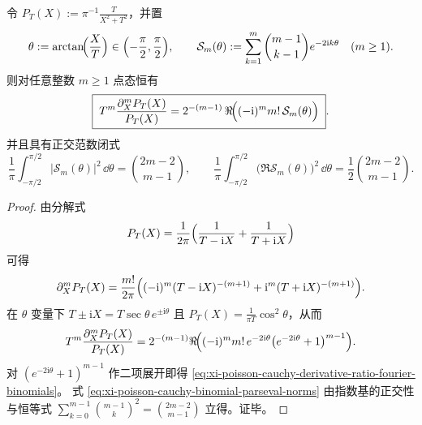 \begin{proposition}\label{prop:xi-poisson-cauchy-derivative-ratio-fourier-binomials}
令 \(P_T(X):=\pi^{-1}\frac{T}{X^2+T^2}\)，并置
\[
\theta:=\arctan\!\Bigl(\frac{X}{T}\Bigr)\in\Bigl(-\frac{\pi}{2},\frac{\pi}{2}\Bigr),
\qquad
\mathcal S_m(\theta):=\sum_{k=1}^{m}\binom{m-1}{k-1}e^{-2\mathrm{i}k\theta}\quad(m\ge 1).
\]
则对任意整数 \(m\ge 1\) 点态恒有
\begin{equation}\label{eq:xi-poisson-cauchy-derivative-ratio-fourier-binomials}
\boxed{\;
T^{m}\frac{\partial_X^{m}P_T(X)}{P_T(X)}
=2^{-(m-1)}\,\Re\!\Bigl((-\mathrm{i})^{m}m!\,\mathcal S_m(\theta)\Bigr)\; }.
\end{equation}
并且具有正交范数闭式
\begin{equation}\label{eq:xi-poisson-cauchy-binomial-parseval-norms}
\frac{1}{\pi}\int_{-\pi/2}^{\pi/2}\bigl|\mathcal S_m(\theta)\bigr|^2\,\dd\theta=\binom{2m-2}{m-1},
\qquad
\frac{1}{\pi}\int_{-\pi/2}^{\pi/2}\bigl(\Re\mathcal S_m(\theta)\bigr)^2\,\dd\theta=\frac12\binom{2m-2}{m-1}.
\end{equation}
\end{proposition}
\begin{proof}
由分解式
\[
P_T(X)=\frac{1}{2\pi}\Bigl(\frac{1}{T-\mathrm{i}X}+\frac{1}{T+\mathrm{i}X}\Bigr)
\]
可得
\[
\partial_X^mP_T(X)=\frac{m!}{2\pi}\Bigl((-\mathrm{i})^{m}(T-\mathrm{i}X)^{-(m+1)}+\mathrm{i}^{m}(T+\mathrm{i}X)^{-(m+1)}\Bigr).
\]
在 \(\theta\) 变量下 \(T\pm \mathrm{i}X=T\sec\theta\,e^{\pm \mathrm{i}\theta}\) 且 \(P_T(X)=\frac{1}{\pi T}\cos^2\theta\)，从而
\[
T^{m}\frac{\partial_X^{m}P_T(X)}{P_T(X)}
=2^{-(m-1)}\Re\!\Bigl((-\mathrm{i})^{m}m!\,e^{-2\mathrm{i}\theta}\bigl(e^{-2\mathrm{i}\theta}+1\bigr)^{m-1}\Bigr).
\]
对 \((e^{-2\mathrm{i}\theta}+1)^{m-1}\) 作二项展开即得 \eqref{eq:xi-poisson-cauchy-derivative-ratio-fourier-binomials}。
式 \eqref{eq:xi-poisson-cauchy-binomial-parseval-norms} 由指数基的正交性与恒等式
\(
\sum_{k=0}^{m-1}\binom{m-1}{k}^2=\binom{2m-2}{m-1}
\)
立得。证毕。
\end{proof}

